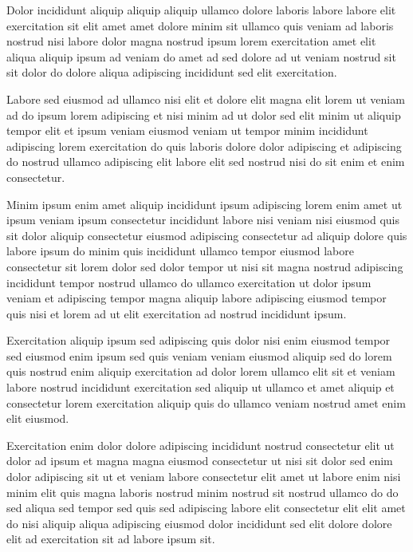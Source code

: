 \documentclass{book}
\begin{document}
Dolor incididunt aliquip aliquip aliquip ullamco dolore laboris labore labore elit exercitation sit elit amet amet dolore minim sit ullamco quis veniam ad laboris nostrud nisi labore dolor magna nostrud ipsum lorem exercitation amet elit aliqua aliquip ipsum ad veniam do amet ad sed dolore ad ut veniam nostrud sit sit dolor do dolore aliqua adipiscing incididunt sed elit exercitation.

Labore sed eiusmod ad ullamco nisi elit et dolore elit magna elit lorem ut veniam ad do ipsum lorem adipiscing et nisi minim ad ut dolor sed elit minim ut aliquip tempor elit et ipsum veniam eiusmod veniam ut tempor minim incididunt adipiscing lorem exercitation do quis laboris dolore dolor adipiscing et adipiscing do nostrud ullamco adipiscing elit labore elit sed nostrud nisi do sit enim et enim consectetur.

Minim ipsum enim amet aliquip incididunt ipsum adipiscing lorem enim amet ut ipsum veniam ipsum consectetur incididunt labore nisi veniam nisi eiusmod quis sit dolor aliquip consectetur eiusmod adipiscing consectetur ad aliquip dolore quis labore ipsum do minim quis incididunt ullamco tempor eiusmod labore consectetur sit lorem dolor sed dolor tempor ut nisi sit magna nostrud adipiscing incididunt tempor nostrud ullamco do ullamco exercitation ut dolor ipsum veniam et adipiscing tempor magna aliquip labore adipiscing eiusmod tempor quis nisi et lorem ad ut elit exercitation ad nostrud incididunt ipsum.

Exercitation aliquip ipsum sed adipiscing quis dolor nisi enim eiusmod tempor sed eiusmod enim ipsum sed quis veniam veniam eiusmod aliquip sed do lorem quis nostrud enim aliquip exercitation ad dolor lorem ullamco elit sit et veniam labore nostrud incididunt exercitation sed aliquip ut ullamco et amet aliquip et consectetur lorem exercitation aliquip quis do ullamco veniam nostrud amet enim elit eiusmod.

Exercitation enim dolor dolore adipiscing incididunt nostrud consectetur elit ut dolor ad ipsum et magna magna eiusmod consectetur ut nisi sit dolor sed enim dolor adipiscing sit ut et veniam labore consectetur elit amet ut labore enim nisi minim elit quis magna laboris nostrud minim nostrud sit nostrud ullamco do do sed aliqua sed tempor sed quis sed adipiscing labore elit consectetur elit elit amet do nisi aliquip aliqua adipiscing eiusmod dolor incididunt sed elit dolore dolore elit ad exercitation sit ad labore ipsum sit.
\end{document}
